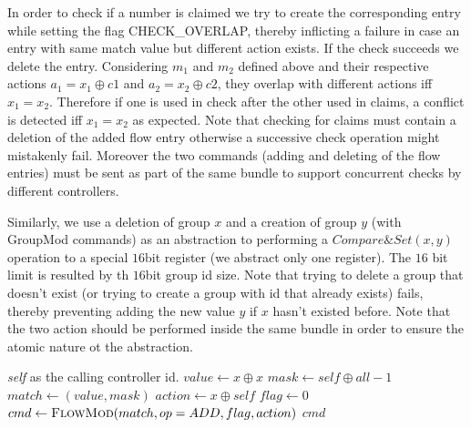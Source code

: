 \documentclass[conference]{sigcomm-alternate}
\newcommand{\concat}[0]{\oplus}
\begin{document}
In order to check if a number is claimed we try to create the corresponding entry while setting the
flag CHECK\_OVERLAP, thereby inflicting a failure in case an entry with same match value but different action exists. If the check succeeds we delete the entry. Considering $m_1$ and $m_2$ defined above and their respective actions $a_1=x_1\concat c1$ and $a_2=x_2\concat c2$,  they overlap with different actions iff $x_1=x_2$. Therefore if one is used in check after the other used in claims, a conflict is detected iff $x_1=x_2$ as expected.
Note that checking for claims must contain a deletion of the added flow entry otherwise a successive check operation might mistakenly fail. Moreover the two commands (adding and deleting of the flow entries) must be sent as part of the same bundle to support concurrent checks by different controllers.

Similarly, we use a deletion of group $x$ and a creation of group $y$ (with GroupMod commands) as an
abstraction to performing a $Compare\&Set(x,y)$ operation to a special $16$bit register (we abstract only one register). The $16$ bit limit is resulted by th $16$bit group id size. 
Note that trying to delete a group that doesn't exist (or trying to create a group with id that already exists) fails, thereby preventing adding the new value $y$ if $x$ hasn't existed before. Note that the two action should be performed inside the same bundle in order to ensure the atomic nature ot the abstraction.



\begin{algorithm}[t]
    \caption{$\textit{claim}(x)$}
    \label{alg:claim}
    \begin{algorithmic}[1]
    \Require \emph{self} as the calling controller id.
    		\State $value \gets x\concat x$
    		\State $mask \gets self\concat all-1$
	    	\State $match \gets (value,mask)$
    		\State $action \gets x\concat self$
    		\State $flag \gets 0$
    		\State $cmd\gets \textsc{FlowMod}(match, op = ADD, flag, action) $
			\Return $cmd$
    \end{algorithmic}
\end{algorithm}
\end{document}

